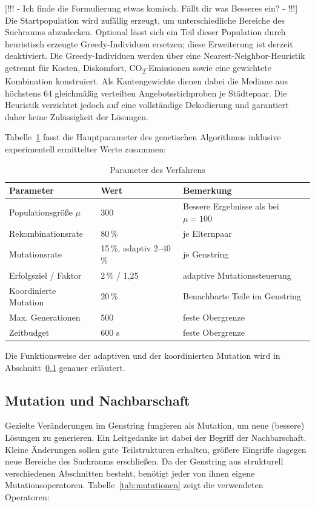 [!!! - Ich finde die Formulierung etwas komisch. Fällt dir was Besseres ein? - !!!] Die Startpopulation wird zufällig erzeugt, um unterschiedliche Bereiche des Suchraums abzudecken. Optional lässt sich ein Teil dieser Population durch heuristisch erzeugte Greedy-Individuen ersetzen; diese Erweiterung ist derzeit deaktiviert. Die Greedy-Individuen werden über eine Nearest-Neighbor-Heuristik getrennt für Kosten, Diskomfort, CO\textsubscript{2}-Emissionen sowie eine gewichtete Kombination konstruiert. Als Kantengewichte dienen dabei die Mediane aus höchstens 64 gleichmäßig verteilten Angebotsstichproben je Städtepaar. Die Heuristik verzichtet jedoch auf eine vollständige Dekodierung und garantiert daher keine Zulässigkeit der Lösungen.

Tabelle~\ref{tab:parameter} fasst die Hauptparameter des genetischen Algorithmus inklusive experimentell ermittelter Werte zusammen:

\begin{table}[htbp]
  \centering
  \begin{tabular}{@{}llp{6.5cm}@{}}
    \toprule
    Parameter & Wert & Bemerkung \\
    \midrule
    Populationsgröße $\mu$ & 300 & Bessere Ergebnisse als bei $\mu = 100$ \\
    Rekombinationsrate & 80\,\% & je Elternpaar \\
    Mutationsrate & 15\,\%, adaptiv 2--40\,\% & je Genstring \\
    Erfolgsziel / Faktor & 2\,\% / 1,25 & adaptive Mutationssteuerung \\
    Koordinierte Mutation & 20\,\% & Benachbarte Teile im Genstring \\
    Max. Generationen & 500 & feste Obergrenze \\
    Zeitbudget & 600 s & feste Obergrenze \\
    \bottomrule
  \end{tabular}
  \caption{Parameter des Verfahrens}
  \label{tab:parameter}
\end{table}

Die Funktionsweise der adaptiven und der koordinierten Mutation wird in Abschnitt~\ref{subsec:mutation} genauer erläutert.

\subsection{Mutation und Nachbarschaft}
\label{subsec:mutation}

Gezielte Veränderungen im Genstring fungieren als Mutation, um neue (bessere) Lösungen zu generieren. Ein Leitgedanke ist dabei der Begriff der Nachbarschaft. Kleine Änderungen sollen gute Teilstrukturen erhalten, größere Eingriffe dagegen neue Bereiche des Suchraums erschließen. Da der Genstring aus strukturell verschiedenen Abschnitten besteht, benötigt jeder von ihnen eigene Mutationsoperatoren. Tabelle~\ref{tab:mutationen} zeigt die verwendeten Operatoren:

